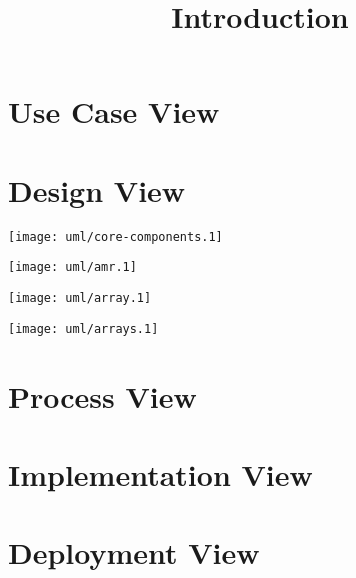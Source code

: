 \documentclass{book}
\begin{document}

\tableofcontents

\title{Introduction} \label{s:intro}


\chapter{Use Case View}

\chapter{Design View}

\centerline{\texttt{[image: uml/core-components.1]}}

\centerline{\texttt{[image: uml/amr.1]}}
\centerline{\texttt{[image: uml/array.1]}}
\centerline{\texttt{[image: uml/arrays.1]}}

\chapter{Process View}
\chapter{Implementation View}
\chapter{Deployment View}
\end{document}
